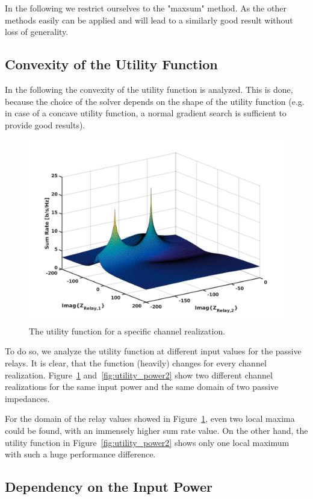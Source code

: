 In the following we restrict ourselves to the "maxsum" method.
As the other methods easily can be applied and will lead to a similarly good result without loss of generality.

\subsection{Convexity of the Utility Function}
\label{sec:}

In the following the convexity of the utility function is analyzed.
This is done, because the choice of the solver depends on the shape of the utility function (e.g. in case of a concave utility function, a normal gradient search is sufficient to provide good results).
\begin{figure}[h]
\centering
  \includegraphics[width=0.8\linewidth]{images/full_mesh_highsnr_93.png}
\caption{The utility function for a specific channel realization.}
\label{fig:utility_power1}
\end{figure}

To do so, we analyze the utility function at different input values for the passive relays.
It is clear, that the function (heavily) changes for every channel realization.
Figure~\ref{fig:utility_power1} and~\ref{fig:utility_power2} show two different channel realizations for the same input power and the same domain of two passive impedances.


For the domain of the relay values showed in Figure~\ref{fig:utility_power1}, even two local maxima could be found, with an immensely higher sum rate value.
On the other hand, the utility function in Figure~\ref{fig:utility_power2} shows only one local maximum with such a huge performance difference. 


\subsection{Dependency on the Input Power}
\label{sec:}

